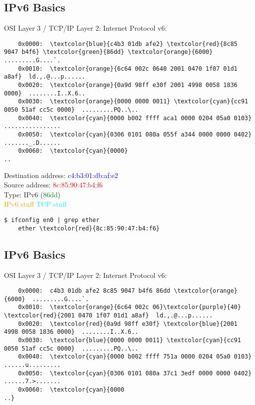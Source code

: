 \documentclass[xga]{xdvislides}
\begin{document}
\subsection{IPv6 Basics}
OSI Layer 3 / TCP/IP Layer 2: Internet Protocol v6:
\begin{Verbatim}
	0x0000:  \textcolor{blue}{c4b3 01db afe2} \textcolor{red}{8c85 9047 b4f6} \textcolor{green}{86dd} \textcolor{orange}{6000}  .........G....`.
	0x0010:  \textcolor{orange}{6c64 002c 0640 2001 0470 1f07 01d1 a8af}  ld.,.@...p......
	0x0020:  \textcolor{orange}{0a9d 98ff e30f 2001 4998 0058 1836 0000}  ........I..X.6..
	0x0030:  \textcolor{orange}{0000 0000 0011} \textcolor{cyan}{cc91 0050 51af cc5c 0000}  .........PQ..\..
	0x0040:  \textcolor{cyan}{0000 b002 ffff aca1 0000 0204 05a0 0103}  ................
	0x0050:  \textcolor{cyan}{0306 0101 080a 055f a344 0000 0000 0402}  ......._.D......
	0x0060:  \textcolor{cyan}{0000}                                     ..
\end{Verbatim}

\vspace{.25in}
Destination address: \textcolor{blue}{c4:b3:01:db:af:e2} \\
Source address: \textcolor{red}{8c:85:90:47:b4:f6} \\
Type: IPv6 (\textcolor{green}{86dd}) \\
\textcolor{orange}{IPv6 stuff}
\textcolor{cyan}{TCP stuff}
\vspace{.15in}

\begin{Verbatim}
$ ifconfig en0 | grep ether
	ether \textcolor{red}{8c:85:90:47:b4:f6}
\end{Verbatim}

\subsection{IPv6 Basics}
OSI Layer 3 / TCP/IP Layer 2: Internet Protocol v6:
\begin{Verbatim}
	0x0000:  c4b3 01db afe2 8c85 9047 b4f6 86dd \textcolor{orange}{6000}  .........G....`.
	0x0010:  \textcolor{orange}{6c64 002c 06}\textcolor{purple}{40} \textcolor{red}{2001 0470 1f07 01d1 a8af}  ld.,.@...p......
	0x0020:  \textcolor{red}{0a9d 98ff e30f} \textcolor{blue}{2001 4998 0058 1836 0000}  ........I..X.6..
	0x0030:  \textcolor{blue}{0000 0000 0011} \textcolor{cyan}{cc91 0050 51af cc5c 0000}  .........PQ..\..
	0x0040:  \textcolor{cyan}{0000 b002 ffff 751a 0000 0204 05a0 0103}  ......u.........
	0x0050:  \textcolor{cyan}{0306 0101 080a 37c1 3edf 0000 0000 0402}  ......7.>.......
	0x0060:  \textcolor{cyan}{0000                                     ..}
\end{Verbatim}
\end{document}
